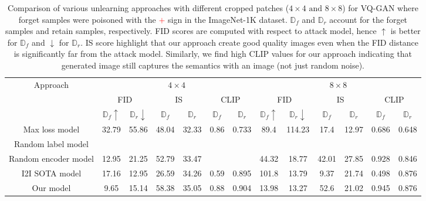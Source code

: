 \begin{table*}[h]
    \centering
    \begin{tabular}{ccccccc||cccccc}
      \toprule
      \multirow{3}{*}{Approach} & \multicolumn{6}{c||}{$4\times4$} & \multicolumn{6}{c}{$8\times8$} \\
      & \multicolumn{2}{c}{FID} & \multicolumn{2}{c}{IS} & \multicolumn{2}{c||}{CLIP} & \multicolumn{2}{c}{FID} & \multicolumn{2}{c}{IS} & \multicolumn{2}{c}{CLIP} \\ \cline{2-13}
      & $\mathbb{D}_f\uparrow$ & $\mathbb{D}_r\downarrow$ & $\mathbb{D}_f$ & $\mathbb{D}_r$ & $\mathbb{D}_f$ & $\mathbb{D}_r$ & $\mathbb{D}_f\uparrow$ & $\mathbb{D}_r\downarrow$ & $\mathbb{D}_f$ & $\mathbb{D}_r$ & $\mathbb{D}_f$ & $\mathbb{D}_r$ \\
      \hline
      Max loss model & 32.79 & 55.86 & 48.04 & 32.33 & 0.86 & 0.733 & 89.4 & 114.23 & 17.4 & 12.97 & 0.686 & 0.648 \\
      Random label model & \\
      Random encoder model & 12.95 & 21.25 & 52.79 & 33.47 & & & 44.32 & 18.77 & 42.01 & 27.85 & 0.928 & 0.846 \\
      I2I SOTA model & 17.16 & 12.95 & 26.59 & 34.26 & 0.59 & 0.895 & 101.8 & 13.79 & 9.37 & 21.74 & 0.498 & 0.876 \\
      Our model & 9.65 & 15.14 & 58.38 & 35.05 & 0.88 & 0.904 & 13.98 & 13.27 & 52.6 & 21.02 & 0.945 & 0.876 \\
      \bottomrule
    \end{tabular}
    \caption{Comparison of various unlearning approaches with different cropped patches ($4\times4 \text{ and } 8\times8$) for VQ-GAN where forget samples were poisoned with the \textcolor{red}{$+$} sign in the ImageNet-1K dataset. $\mathbb{D}_f$ and $\mathbb{D}_r$ account for the forget samples and retain samples, respectively. FID scores are computed with respect to attack model, hence $\uparrow$ is better for $\mathbb{D}_f$ and $\downarrow$ for $\mathbb{D}_r$. IS score highlight that our approach create good quality images even when the FID distance is significantly far from the attack model. Similarly, we find high CLIP values for our approach indicating that generated image still captures the semantics with an image (not just random noise).}
    \label{tab:diff_model results}
\end{table*}


